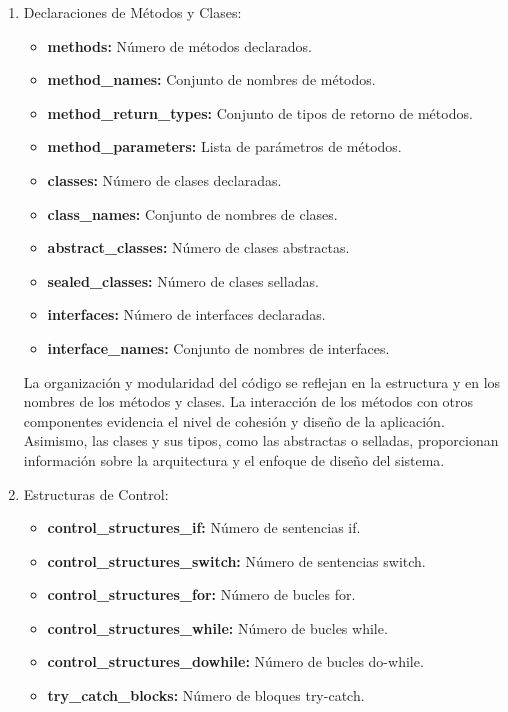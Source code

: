 \begin{enumerate}
    \item Declaraciones de Métodos y Clases:
    \begin{itemize}
        \item {\bf methods:} Número de métodos declarados.
        \item {\bf method\_names:} Conjunto de nombres de métodos.
        \item {\bf method\_return\_types:} Conjunto de tipos de retorno de métodos.
        \item {\bf method\_parameters:} Lista de parámetros de métodos.
        \item {\bf classes:} Número de clases declaradas.
        \item {\bf class\_names:} Conjunto de nombres de clases.
        \item {\bf abstract\_classes:} Número de clases abstractas.
        \item {\bf sealed\_classes:} Número de clases selladas.
        \item {\bf interfaces:} Número de interfaces declaradas.
        \item {\bf interface\_names:} Conjunto de nombres de interfaces.
    \end{itemize}
    
    La organización y modularidad del código se reflejan en la estructura y en los nombres de los métodos y clases. La interacción de los métodos con otros componentes evidencia el nivel de cohesión y diseño de la aplicación. Asimismo, las clases y sus tipos, como las abstractas o selladas, proporcionan información sobre la arquitectura y el enfoque de diseño del sistema.

    \item Estructuras de Control:
    \begin{itemize}
        \item {\bf control\_structures\_if:} Número de sentencias if.
        \item {\bf control\_structures\_switch:} Número de sentencias switch.
        \item {\bf control\_structures\_for:} Número de bucles for.
        \item {\bf control\_structures\_while:} Número de bucles while.
        \item {\bf control\_structures\_dowhile:} Número de bucles do-while.
        \item {\bf try\_catch\_blocks:} Número de bloques try-catch.
    \end{itemize}
    

\end{enumerate}
